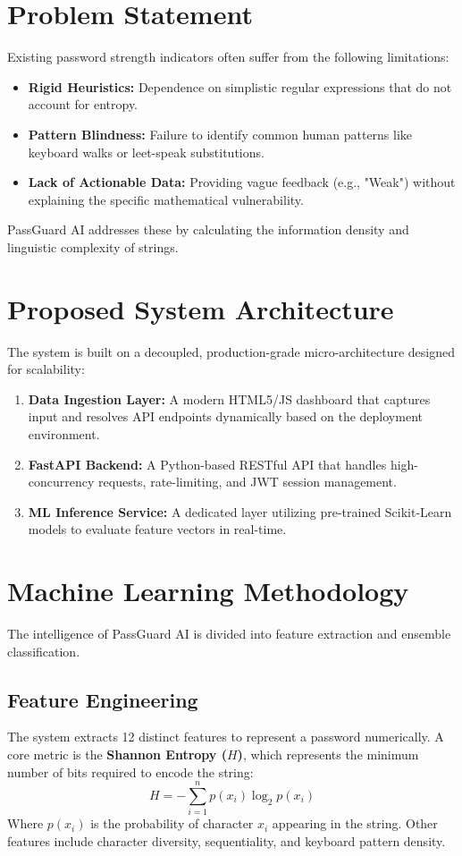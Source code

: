 \documentclass[12pt,a4paper]{article}
\begin{document}
\section{Problem Statement}
Existing password strength indicators often suffer from the following limitations:
\begin{itemize}[label=\textbullet]
    \item \textbf{Rigid Heuristics:} Dependence on simplistic regular expressions that do not account for entropy.
    \item \textbf{Pattern Blindness:} Failure to identify common human patterns like keyboard walks or leet-speak substitutions.
    \item \textbf{Lack of Actionable Data:} Providing vague feedback (e.g., "Weak") without explaining the specific mathematical vulnerability.
\end{itemize}
PassGuard AI addresses these by calculating the information density and linguistic complexity of strings.

\section{Proposed System Architecture}
The system is built on a decoupled, production-grade micro-architecture designed for scalability:
\begin{enumerate}
    \item \textbf{Data Ingestion Layer:} A modern HTML5/JS dashboard that captures input and resolves API endpoints dynamically based on the deployment environment.
    \item \textbf{FastAPI Backend:} A Python-based RESTful API that handles high-concurrency requests, rate-limiting, and JWT session management.
    \item \textbf{ML Inference Service:} A dedicated layer utilizing pre-trained Scikit-Learn models to evaluate feature vectors in real-time.
\end{enumerate}

\section{Machine Learning Methodology}
The intelligence of PassGuard AI is divided into feature extraction and ensemble classification.

\subsection{Feature Engineering}
The system extracts 12 distinct features to represent a password numerically. A core metric is the \textbf{Shannon Entropy ($H$)}, which represents the minimum number of bits required to encode the string:
\begin{equation}
    H = -\sum_{i=1}^{n} p(x_i) \log_2 p(x_i)
\end{equation}
Where $p(x_i)$ is the probability of character $x_i$ appearing in the string. Other features include character diversity, sequentiality, and keyboard pattern density.
\end{document}
